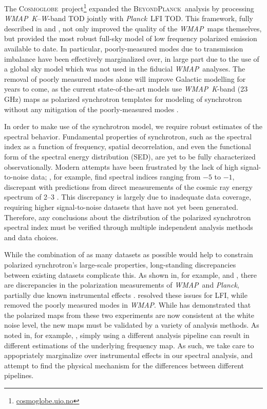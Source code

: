 \documentclass[twocolumn]{../../common/aa}
\def\WMAP{\emph{WMAP}}
\def\Planck{\emph{Planck}}
\newcommand{\bp}{\textsc{BeyondPlanck}}
\newcommand{\cosmoglobe}{\textsc{Cosmoglobe}}
\newcommand{\K}[0]{\textit K}
\newcommand{\W}[0]{\textit W}
\begin{document}
The \cosmoglobe\ project\footnote{\url{cosmoglobe.uio.no}} expanded the \bp\ analysis by processing \WMAP\ \K--\W-band TOD jointly with \Planck\ LFI TOD. This framework, fully described in \citet{bp17} and \cite{watts2023_dr1},
not only improved the quality of the \WMAP\ maps themselves, but provided the most robust full-sky model of low frequency polarized emission available to date. In particular, poorly-measured modes due to transmission imbalance \citep{jarosik2007} have been effectively marginalized over, in large part due to the use of a global sky model which was not used in the fiducial \WMAP\ analyses. The removal of poorly measured modes alone will improve Galactic modelling for years to come, as the current state-of-the-art models use \WMAP\ \K-band (23\,GHz) maps as polarized synchrotron templates for modeling of synchrotron without any mitigation of the poorly-measured modes \citep{delabrouille2012,pysm2,pysm3}.

In order to make use of the synchrotron model, we require robust estimates of the spectral behavior. Fundamental properties of synchrotron, such as the spectral index as a function of frequency, spatial decorrelation, and even the functional form of the spectral energy distribution (SED), are yet to be fully characterized observationally. Modern attempts have been frustrated by the lack of high signal-to-noise data; \citet{deBelsunce:2022}, for example, find spectral indices ranging from $-5$ to $-1$, discrepant with predictions from direct measurements of the cosmic ray energy spectrum of 2--3 \citep{rybicki,orlando2013,neronov2017}. This discrepancy is largely due to inadequate data coverage, requiring higher signal-to-noise datasets that have not yet been generated. Therefore, any conclusions about the distribution of the polarized synchrotron spectral index must be verified through multiple independent analysis methods and data choices.


While the combination of as many datasets as possible would help to constrain polarized synchrotron's large-scale properties, long-standing discrepancies between existing datasets complicate this. As shown in, for example, \citet{planck2014-a12} and \citet{weiland:2018}, there are discrepancies in the polarization measurements of \WMAP\ and \Planck, partially due known instrumental effects \citep{bennett2012,planck2016-l02}. \citet{bp01} resolved these issues for LFI, while \citet{bp17} removed the poorly measured modes in \WMAP.  While \citet{watts2023_dr1} has demonstrated that the polarized maps from these two experiments are now consistent at the white noise level, the new maps must be validated by a variety of analysis methods. As noted in, for example, \citet{weiland:2022}, simply using a different analysis pipeline can result in different estimations of the underlying frequency map. As such, we take care to appopriately marginalize over instrumental effects in our spectral analysis, and attempt to find the physical mechanism for the differences between different pipelines.
\end{document}

